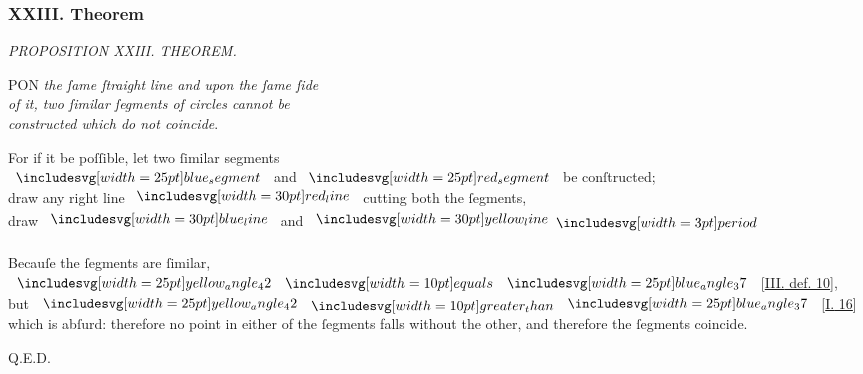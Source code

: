 \documentclass[12pt,preview]{standalone}
\begin{document}
\subsubsection{XXIII. Theorem}

\begin{minipage}[t]{0.64\textwidth}
    \vspace{0pt}

    \begin{center}
        \textit{PROPOSITION XXIII. THEOREM.}\label{book3pr23} \\
    \end{center}

    \hfill

    \begin{center}
        \raggedright \lettrine[lines=4, loversize=1, nindent=0pt]{}{}PON \textit{the ſame ſtraight line and upon the ſame ſide\\ of it, two ſimilar ſegments of circles cannot be\\ constructed which do not coincide}.
    \end{center}

    \hfill

    \hfill

    \begin{center}
        For if it be poſſible, let two ſimilar segments\\
        $\img{blue_segment}$ and $\img{red_segment}$ be conſtructed;\\
        draw any right line $\redline$ cutting both the ſegments,\\
        draw $\blueline$ and $\yellowline \bperiod$\\
        \hfill\\
        Becauſe the ſegments are ſimilar,\\
        $\img{yellow_angle_42} \bequals \img{blue_angle_37}$ [\hyperref[book3def10]{\textsc{III.} def. 10}],\\
        but $\img{yellow_angle_42} \bgt \img{blue_angle_37}$ [\hyperref[book1pr16]{\textsc{I.} 16}]\\
        which is abſurd: therefore no point in either of the ſegments falls without the other, and therefore the ſegments coincide.
    \end{center}

    \hfill

    \hfill Q.E.D.
\end{minipage}%
\hfill
\begin{minipage}[t]{0.33\textwidth}
    \vspace{40pt}
    
\end{minipage}%
\end{document}
